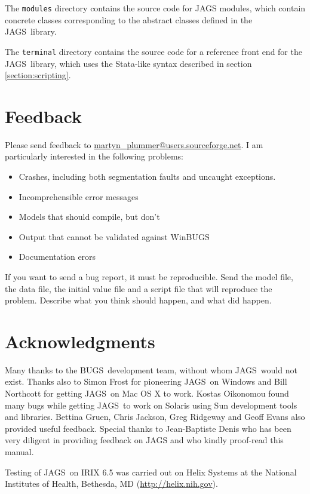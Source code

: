 \documentclass[11pt, a4paper, titlepage]{report}
\newcommand{\JAGS}{\textsf{JAGS}}
\newcommand{\BUGS}{\textsf{BUGS}}
\newcommand{\WinBUGS}{\textsf{WinBUGS}}
\begin{document}
The \texttt{modules} directory contains the source code for JAGS
modules, which contain concrete classes corresponding to the abstract
classes defined in the \JAGS\ library.

The \texttt{terminal} directory contains the source code for a
reference front end for the \JAGS\ library, which uses the
\textsf{Stata}-like syntax described in section
\ref{section:scripting}.

\chapter{Feedback}

Please send feedback to \url{martyn_plummer@users.sourceforge.net}.
I am particularly interested in the following problems:

\begin{itemize}
\item Crashes, including both segmentation faults and uncaught exceptions.
\item Incomprehensible error messages
\item Models that should compile, but don't 
\item Output that cannot be validated against \WinBUGS
\item Documentation erors
\end{itemize}

If you want to send a bug report, it must be reproducible. Send the
model file, the data file, the initial value file and a script file
that will reproduce the problem. Describe what you think should
happen, and what did happen.

\chapter{Acknowledgments}

Many thanks to the \BUGS\ development team, without whom \JAGS\ would
not exist.  Thanks also to Simon Frost for pioneering \JAGS\ on
Windows and Bill Northcott for getting \JAGS\ on Mac OS X to
work. Kostas Oikonomou found many bugs while getting \JAGS\ to work on
Solaris using Sun development tools and libraries.  Bettina Gruen,
Chris Jackson, Greg Ridgeway and Geoff Evans also provided useful
feedback.  Special thanks to Jean-Baptiste Denis who has been very
diligent in providing feedback on JAGS and who kindly proof-read this
manual.

Testing of \JAGS\ on IRIX 6.5 was carried out on Helix Systems at the
National Institutes of Health, Bethesda, MD (\url{http://helix.nih.gov}).
\end{document}
